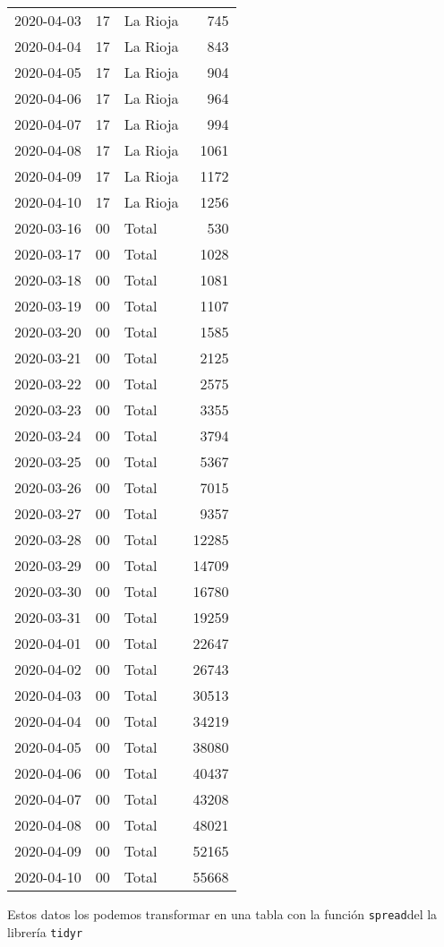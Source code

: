 \documentclass[
]{article}
\newenvironment{Shaded}{\begin{snugshade}}{\end{snugshade}}
\newcommand{\KeywordTok}[1]{\textcolor[rgb]{0.13,0.29,0.53}{\textbf{#1}}}
\newcommand{\NormalTok}[1]{#1}
\newcommand{\OperatorTok}[1]{\textcolor[rgb]{0.81,0.36,0.00}{\textbf{#1}}}
\newcommand{\StringTok}[1]{\textcolor[rgb]{0.31,0.60,0.02}{#1}}
\begin{document}
\begin{longtable}[]{@{}lllr@{}}
2020-04-03 & 17 & La Rioja & 745\tabularnewline
2020-04-04 & 17 & La Rioja & 843\tabularnewline
2020-04-05 & 17 & La Rioja & 904\tabularnewline
2020-04-06 & 17 & La Rioja & 964\tabularnewline
2020-04-07 & 17 & La Rioja & 994\tabularnewline
2020-04-08 & 17 & La Rioja & 1061\tabularnewline
2020-04-09 & 17 & La Rioja & 1172\tabularnewline
2020-04-10 & 17 & La Rioja & 1256\tabularnewline
2020-03-16 & 00 & Total & 530\tabularnewline
2020-03-17 & 00 & Total & 1028\tabularnewline
2020-03-18 & 00 & Total & 1081\tabularnewline
2020-03-19 & 00 & Total & 1107\tabularnewline
2020-03-20 & 00 & Total & 1585\tabularnewline
2020-03-21 & 00 & Total & 2125\tabularnewline
2020-03-22 & 00 & Total & 2575\tabularnewline
2020-03-23 & 00 & Total & 3355\tabularnewline
2020-03-24 & 00 & Total & 3794\tabularnewline
2020-03-25 & 00 & Total & 5367\tabularnewline
2020-03-26 & 00 & Total & 7015\tabularnewline
2020-03-27 & 00 & Total & 9357\tabularnewline
2020-03-28 & 00 & Total & 12285\tabularnewline
2020-03-29 & 00 & Total & 14709\tabularnewline
2020-03-30 & 00 & Total & 16780\tabularnewline
2020-03-31 & 00 & Total & 19259\tabularnewline
2020-04-01 & 00 & Total & 22647\tabularnewline
2020-04-02 & 00 & Total & 26743\tabularnewline
2020-04-03 & 00 & Total & 30513\tabularnewline
2020-04-04 & 00 & Total & 34219\tabularnewline
2020-04-05 & 00 & Total & 38080\tabularnewline
2020-04-06 & 00 & Total & 40437\tabularnewline
2020-04-07 & 00 & Total & 43208\tabularnewline
2020-04-08 & 00 & Total & 48021\tabularnewline
2020-04-09 & 00 & Total & 52165\tabularnewline
2020-04-10 & 00 & Total & 55668\tabularnewline
\bottomrule
\end{longtable}

Estos datos los podemos transformar en una tabla con la función
\texttt{spread}del la librería \texttt{tidyr}

\begin{Shaded}
\end{Shaded}
\end{document}

